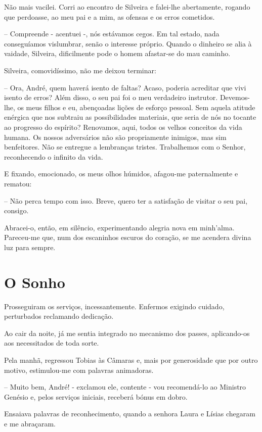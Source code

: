 \documentclass[portuguese,12pt,a4paper]{scrbook}
\begin{document}
	Não mais vacilei. Corri ao encontro de Silveira e falei-lhe abertamente, rogando que perdoasse, ao meu pai e a mim, as ofensas e os erros cometidos.
	
	– Compreende - acentuei -, nós estávamos cegos. Em tal estado, nada conseguíamos vislumbrar, senão o interesse próprio. Quando o dinheiro se alia à vaidade, Silveira, dificilmente pode o homem afastar-se do mau caminho.
	
	Silveira, comovidíssimo, não me deixou terminar:
	
	– Ora, André, quem haverá isento de faltas? Acaso, poderia acreditar que vivi isento de erros? Além disso, o seu pai foi o meu verdadeiro instrutor. Devemos-lhe, os meus filhos e eu, abençoadas lições de esforço pessoal. Sem aquela atitude enérgica que nos subtraiu as possibilidades materiais, que seria de nós no tocante ao progresso do espírito? Renovamos, aqui, todos os velhos conceitos da vida humana. Os nossos adversários não são propriamente inimigos, mas sim benfeitores. Não se entregue a lembranças tristes. Trabalhemos com o Senhor, reconhecendo o infinito da vida.
	
	
	E fixando, emocionado, os meus olhos húmidos, afagou-me paternalmente e rematou:
	
	– Não perca tempo com isso. Breve, quero ter a satisfação de visitar o seu pai, consigo.
	
	Abracei-o, então, em silêncio, experimentando alegria nova em minh'alma. Pareceu-me que, num dos escaninhos escuros do coração, se me acendera divina luz para sempre.
	
	
	\chapter{O Sonho}
	
	Prosseguiram os serviços, incessantemente. Enfermos exigindo cuidado, perturbados reclamando dedicação.
	
	Ao cair da noite, já me sentia integrado no mecanismo dos passes, aplicando-os aos necessitados de toda sorte.
	
	Pela manhã, regressou Tobias às Câmaras e, mais por generosidade que por outro motivo, estimulou-me com palavras animadoras.
	
	– Muito bem, André! - exclamou ele, contente - vou recomendá-lo ao Ministro Genésio e, pelos serviços iniciais, receberá bónus em dobro.
	
	Ensaiava palavras de reconhecimento, quando a senhora Laura e Lísias chegaram e me abraçaram.
	
\end{document}
